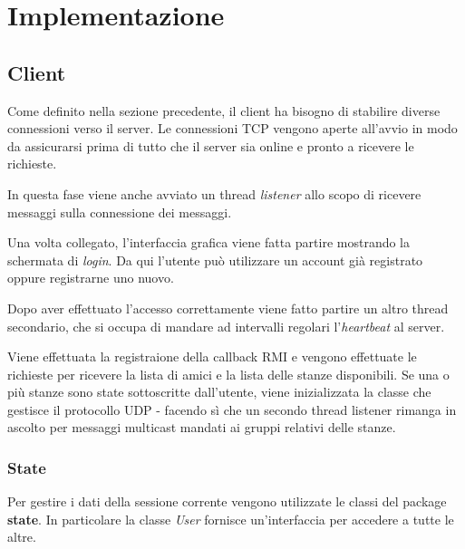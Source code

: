 \section{Implementazione}
\subsection{Client}
Come definito nella sezione precedente, il client ha bisogno di stabilire diverse connessioni verso il server. Le connessioni TCP vengono aperte all'avvio in modo da assicurarsi prima di tutto che il server sia online e pronto a ricevere le richieste.

In questa fase viene anche avviato un thread \textit{listener} allo scopo di ricevere messaggi sulla connessione dei messaggi.

Una volta collegato, l'interfaccia grafica viene fatta partire mostrando la schermata di \textit{login}. Da qui l'utente può utilizzare un account già registrato oppure registrarne uno nuovo.

Dopo aver effettuato l'accesso correttamente viene fatto partire un altro thread secondario, che si occupa di mandare ad intervalli regolari l'\textit{heartbeat} al server.

Viene effettuata la registraione della callback RMI e vengono effettuate le richieste per ricevere la lista di amici e la lista delle stanze disponibili.
Se una o più stanze sono state sottoscritte dall'utente, viene inizializzata la classe che gestisce il protocollo UDP - facendo sì che un secondo thread listener rimanga in ascolto per messaggi multicast mandati ai gruppi relativi delle stanze.

\subsubsection{State}
Per gestire i dati della sessione corrente vengono utilizzate le classi del package \textbf{state}. In particolare la classe \textit{User} fornisce un'interfaccia per accedere a tutte le altre.

